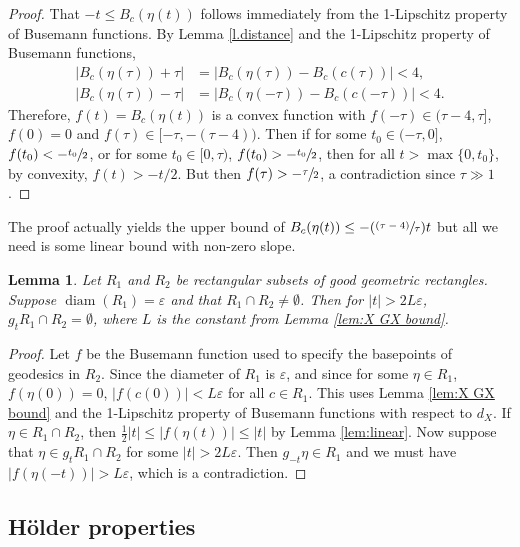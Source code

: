 \documentclass[10pt]{amsart}
\let\epsilon\varepsilon
\newcommand{\Ppsfrac}[2]{(\sfrac{(#1)}{#2})}
\newtheorem{lem}[thm]{Lemma}
\theoremstyle{definition}
\numberwithin{equation}{section}
\DeclareMathOperator{\diam}{diam}
\begin{document}
\begin{proof}
That $-t \leq B_{c}(\eta(t))$ follows immediately from the 1-Lipschitz property of Busemann functions. By Lemma \ref{l.distance} and the 1-Lipschitz property of Busemann functions,
\begin{align*}
|B_{c}(\eta(\tau)) + \tau | &= | B_{c}(\eta(\tau)) - B_{c}(c(\tau)) | < 4,\\ \tag*{and similarly} |B_{c}(\eta(\tau)) - \tau | &= | B_{c}(\eta(-\tau)) - B_{c}(c(-\tau)) | < 4. 
\end{align*}
Therefore, $f(t) = B_{c}(\eta(t))$ is a convex function with $f(-\tau)\in (\tau-4,\tau]$, $f(0)=0$ and $f(\tau) \in [-\tau,-(\tau-4))$. Then if for some $t_0 \in (-\tau,0]$, $f(t_0) < -\sfrac{t_0}{2}$, or for some $t_0 \in [0,\tau)$, $f(t_0)>-\sfrac{t_0}{2}$, then for all $t>\max\{0,t_0\}$, by convexity, $f(t) > -t/2$. But then $f(\tau) > -\sfrac{\tau}{2}$, a contradiction since $\tau\gg 1$.
\end{proof}

The proof actually yields the upper bound of $B_{c}(\eta(t)) \leq - \Ppsfrac{\tau-4}{\tau} t$ but all we need is some linear bound with non-zero slope.

\begin{lem}\label{lem:deform tool}
Let $R_1$ and $R_2$ be rectangular subsets of good geometric rectangles. Suppose $\diam(R_1) = \epsilon$ and that $R_1 \cap R_2 \neq \emptyset$. Then for $|t|>2L\epsilon$, $g_tR_1 \cap R_2 = \emptyset$, where $L$ is the constant from Lemma \ref{lem:X GX bound}.
\end{lem}

\begin{proof}
Let $f$ be the Busemann function used to specify the basepoints of geodesics in $R_2$. Since the diameter of $R_1$ is $\epsilon$, and since for some $\eta\in R_1$, $f(\eta(0))=0$, $|f(c(0))| < L\epsilon$ for all $c\in R_1$. This uses Lemma \ref{lem:X GX bound} and the 1-Lipschitz property of Busemann functions with respect to $d_X$. If $\eta \in R_1 \cap R_2$, then $\frac{1}{2}|t| \leq |f(\eta(t))| \leq |t|$ by Lemma \ref{lem:linear}. Now suppose that $\eta \in g_tR_1 \cap R_2$ for some $|t|>2L\epsilon$. Then $g_{-t}\eta \in R_1$ and we must have $|f(\eta(-t))| > L\epsilon$, which is a contradiction.
\end{proof}

\subsection{Hölder properties}
\end{document}
